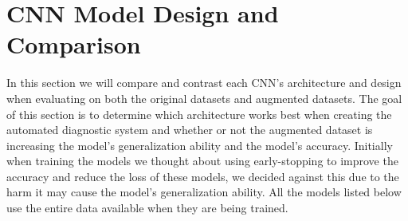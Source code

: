 \section{CNN Model Design and Comparison}
In this section we will compare and contrast each CNN's architecture and design when evaluating on both the original datasets and augmented datasets.  The goal of this section is to determine which architecture works best when creating the automated diagnostic system and whether or not the augmented dataset is increasing the model's generalization ability and the model's accuracy. Initially when training the models we thought about using early-stopping to improve the accuracy and reduce the loss of these models, we decided against this due to the harm it may cause the model's generalization ability.  All the models listed below use the entire data available when they are being trained.
